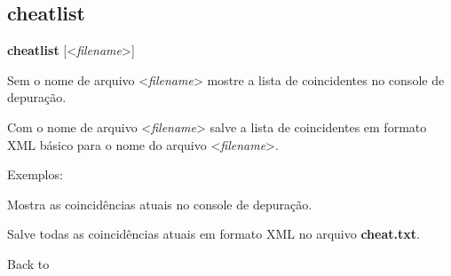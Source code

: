 \documentclass[letterpaper,10pt,brazil]{sphinxmanual}
\begin{document}
\subsection{cheatlist}
\label{debugger/cheats:debugger-command-cheatlist}\label{debugger/cheats:cheatlist}
\begin{DUlineblock}{0em}
\item[]
\begin{DUlineblock}{\DUlineblockindent}
\item[] \textbf{cheatlist} {[}\textless{}\emph{filename}\textgreater{}{]}
\item[] 
\end{DUlineblock}
\item[] Sem o nome de arquivo \textless{}\emph{filename}\textgreater{} mostre a lista de coincidentes no console de depuração.
\item[] Com o nome de arquivo \textless{}\emph{filename}\textgreater{} salve a lista de coincidentes em formato XML básico para o nome do arquivo \textless{}\emph{filename}\textgreater{}.
\item[] 
\item[] Exemplos:
\item[] 
\item[]
\begin{DUlineblock}{\DUlineblockindent}
\item[] 
\item[] 
\end{DUlineblock}
\item[] Mostra as coincidências atuais no console de depuração.
\item[] 
\item[]
\begin{DUlineblock}{\DUlineblockindent}
\item[] 
\item[] 
\end{DUlineblock}
\item[] Salve todas as coincidências atuais em formato XML no arquivo \textbf{cheat.txt}.
\item[] 
\item[] Back to {\hyperref[debugger/cheats:debugger\string-cheats\string-list]{}}
\end{DUlineblock}
\begin{quote}
\label{debugger/cheats:debugger-command-cheatundo}\end{quote}
\end{document}
